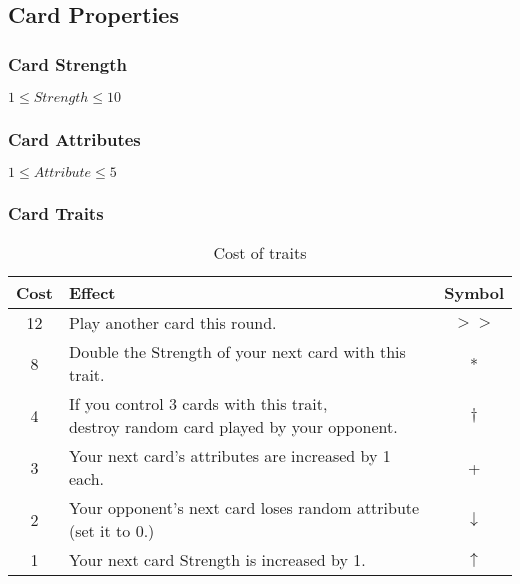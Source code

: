 \documentclass{article}
\begin{document}
\subsection{Card Properties}
\subsubsection{Card Strength}
    $1 \leq Strength \leq 10$
\subsubsection{Card Attributes}
    $1 \leq Attribute \leq 5$
\subsubsection{Card Traits}

\begin{table}[h]
    \begin{tabular}{ | c | l | c |}
        \hline
        Cost & Effect & Symbol\\ \hline
        12 & Play another card this round. & $>>$ \\  \hline
        8 & Double the Strength of your next card with this trait. & * \\ \hline
        4 & \pbox{25cm}{If you control 3 cards with this trait, 
        \\destroy random card played by your opponent.}  & $\dagger$ \\  \hline
        3 & Your next card's attributes are increased by 1 each. & +\\ \hline
        2 & Your opponent's next card loses random attribute (set it to 0.) & $\downarrow$ \\ \hline
        1 & Your next card Strength is increased by 1.& $\uparrow$ \\ \hline
    \end{tabular}
\caption{Cost of traits}
\label{tab:traitcost}
\end{table}
\end{document}
